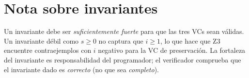 \section{Nota sobre invariantes}

Un invariante debe ser \emph{suficientemente fuerte} para que las tres VCs sean
válidas. Un invariante débil como $s \geq 0$ no captura que $i \geq 1$, lo que
hace que Z3 encuentre contraejemplos con $i$ negativo para la VC de
preservación. La fortaleza del invariante es responsabilidad del programador;
el verificador comprueba que el invariante dado es \emph{correcto} (no que sea
\emph{completo}).
